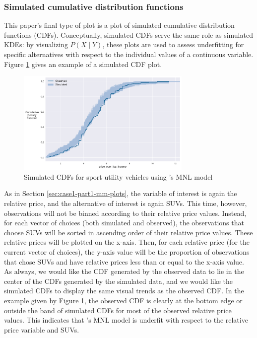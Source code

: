 \documentclass[preprint]{elsarticle}
\begin{document}
\subsubsection{Simulated cumulative distribution functions}
\label{sec:case1-part1-cdfs}
This paper's final type of plot is a plot of simulated cumulative distribution functions (CDFs). Conceptually, simulated CDFs serve the same role as simulated KDEs: by visualizing $P \left( X \mid Y \right)$, these plots are used to assess underfitting for specific alternatives with respect to the individual values of a continuous variable. Figure \ref{fig:orig-mnl-suv-cdf} gives an example of a simulated CDF plot.

\begin{figure}
\centering
\includegraphics[width=0.75\textwidth]{cdf-vehicle-choice-mnl-suv-price}
\caption{Simulated CDFs for sport utility vehicles using \citeauthor{brownstone_forecasting_1998}'s MNL model}
\label{fig:orig-mnl-suv-cdf}
\end{figure}

As in Section \ref{sec:case1-part1-mm-plots}, the variable of interest is again the relative price, and the alternative of interest is again SUVs. This time, however, observations will not be binned according to their relative price values. Instead, for each vector of choices (both simulated and observed), the observations that choose SUVs will be sorted in ascending order of their relative price values. These relative prices will be plotted on the x-axis. Then, for each relative price (for the current vector of choices), the y-axis value will be the proportion of observations that chose SUVs and have relative prices less than or equal to the x-axis value. As always, we would like the CDF generated by the observed data to lie in the center of the CDFs generated by the simulated data, and we would like the simulated CDFs to display the same visual trends as the observed CDF. In the example given by Figure \ref{fig:orig-mnl-suv-cdf}, the observed CDF is clearly at the bottom edge or outside the band of simulated CDFs for most of the observed relative price values. This indicates that \citeauthor{brownstone_forecasting_1998}'s MNL model is underfit with respect to the relative price variable and SUVs.
\end{document}
